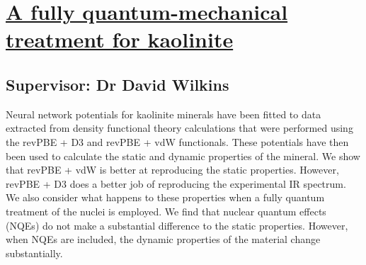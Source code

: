 \section{\href{https://doi.org/10.1063/5.0152361}{A fully quantum-mechanical treatment for kaolinite}}

\subsection*{Supervisor: Dr David Wilkins}


Neural network potentials for kaolinite minerals have been fitted to data extracted from density functional theory calculations that were performed using the revPBE + D3 and revPBE + vdW functionals. These potentials have then been used to calculate the static and dynamic properties of the mineral. We show that revPBE + vdW is better at reproducing the static properties. However, revPBE + D3 does a better job of reproducing the experimental IR spectrum. We also consider what happens to these properties when a fully quantum treatment of the nuclei is employed. We find that nuclear quantum effects (NQEs) do not make a substantial difference to the static properties. However, when NQEs are included, the dynamic properties of the material change substantially.
